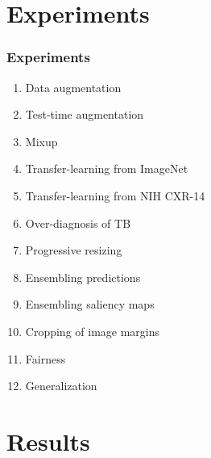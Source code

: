 \documentclass[8pt]{beamer}
\begin{document}
\section{Experiments}
        \begin{frame}
          \frametitle{Experiments}
          \begin{enumerate}
          \item{Data augmentation} \pause
          \item{Test-time augmentation}\pause
          \item{Mixup}\pause
          \item{Transfer-learning from ImageNet}\pause
          \item{Transfer-learning from NIH CXR-14}\pause
          \item{Over-diagnosis of TB}\pause
          \item{Progressive resizing}\pause
          \item{Ensembling predictions}\pause
          \item{Ensembling saliency maps}\pause
          \item{Cropping of image margins}\pause
          \item{Fairness}\pause
          \item{Generalization}\pause
             
          \end{enumerate}

        \end{frame}

        \section{Results}
        
\end{document}

